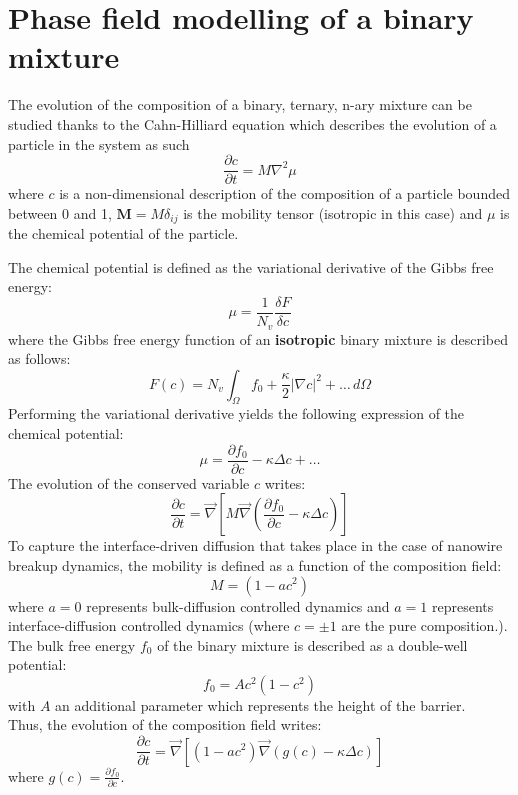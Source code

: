 \section{Phase field modelling of a binary mixture}
    The evolution of the composition of a binary, ternary, n-ary mixture can be studied thanks to the Cahn-Hilliard equation which describes the evolution of a particle in the system as such
    \begin{equation}
        \frac{\partial c}{\partial t} = M \nabla^2 \mu 
    \end{equation}
    where $c$ is a non-dimensional description of the composition of a particle bounded between 0 and 1, $\mathbf{M} = M \delta_{ij}$ is the mobility tensor (isotropic in this case) and $\mu$ is the chemical potential of the particle.

    The chemical potential is defined as the variational derivative of the Gibbs free energy:
    \begin{equation}
        \mu = \frac{1}{N_v} \frac{\delta F}{\delta c}
    \end{equation}
    where the Gibbs free energy function of an \textbf{isotropic} binary mixture is described as follows: %
    \begin{equation}
        F(c) = N_v\int_\Omega f_0 + \frac{\kappa}{2} |\nabla c|^2 + \dots\,d\Omega
    \end{equation}
    Performing the variational derivative yields the following expression of the chemical potential:
    \begin{equation}
        \mu = \frac{\partial f_0}{\partial c} - \kappa \Delta c + \dots
    \end{equation}
    The evolution of the conserved variable $c$ writes:
    \begin{equation}
        \frac{\partial c}{\partial t} = \Vec{\nabla}\left[M \Vec{\nabla}\left(\frac{\partial f_0}{\partial c} - \kappa\Delta c \right) \right]
    \end{equation}
    To capture the interface-driven diffusion that takes place in the case of nanowire breakup dynamics, the mobility is defined as a function of the composition field:
    \begin{equation}
        M=(1-ac^2)
    \end{equation}
    where $a=0$ represents bulk-diffusion controlled dynamics and $a=1$ represents interface-diffusion controlled dynamics (where $c=\pm1$ are the pure composition.).\\
    The bulk free energy $f_0$ of the binary mixture is described as a double-well potential:
    \begin{equation}
        f_0 = Ac^2(1-c^2)
    \end{equation}
    with $A$ an additional parameter which represents the height of the barrier.\\
    Thus, the evolution of the composition field writes:
        \begin{equation}
        \frac{\partial c}{\partial t} = \Vec{\nabla}\left[(1-ac^2) \Vec{\nabla}\left(g(c) - \kappa\Delta c \right) \right]
    \end{equation}
    where $g(c)=\frac{\partial f_0}{\partial c}$.
